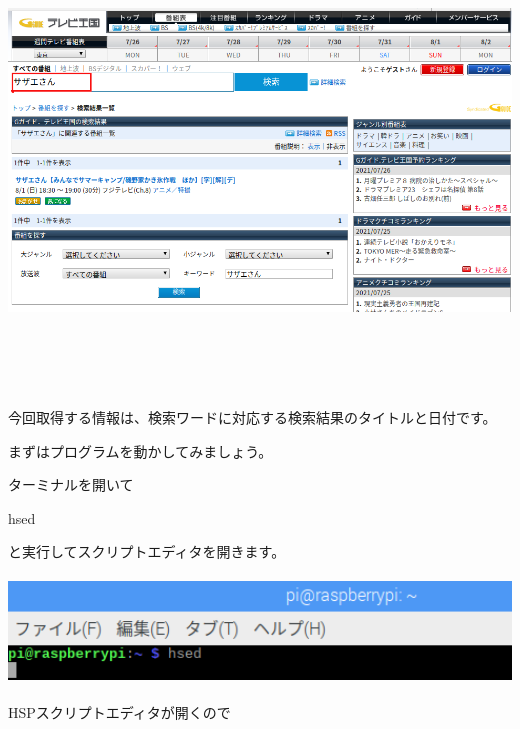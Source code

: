 \documentclass[a4paper,12pt,dvipdfmx]{jarticle}
\begin{document}
\begin{center}
\includegraphics[width=17.006cm,height=12.157cm]{textbook-img042.png}

\end{center}
今回取得する情報は、検索ワードに対応する検索結果のタイトルと日付です。

まずはプログラムを動かしてみましょう。

ターミナルを開いて

hsed

と実行してスクリプトエディタを開きます。

\begin{center}
\includegraphics[width=17.057cm,height=2.866cm]{textbook-img013.png}

\end{center}

\bigskip



\bigskip

\clearpage
HSPスクリプトエディタが開くので
\end{document}
